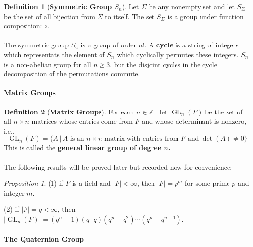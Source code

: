 \documentclass[paper=a4, fontsize=11pt]{scrartcl}
\numberwithin{equation}{section}		%
\numberwithin{figure}{section}			%
\numberwithin{table}{section}				%
\newcommand{\GL}{\ensuremath{\operatorname{GL}}}
\renewcommand{\det}{\ensuremath{\operatorname{det}}}
\theoremstyle{definition}
\newtheorem{definition}{Definition}[section]
\theoremstyle{remark}
\theoremstyle{example}
\newtheorem{prop}{Proposition}[section]
\begin{document}
\begin{definition}[\textbf{Symmetric Group $S_n$}]
    Let $\Sigma$ be any nonempty set and let $S_{\Sigma}$ be the set of all bijection from $\Sigma$ to itself. The set $S_{\Sigma}$ is a group under function composition: $\circ$.
\end{definition}

\paragraph{}

The symmetric group $S_n$ is a group of order $n!$. A \textbf{cycle} is a string of integers which representats the element of $S_n$ which cyclically permutes these integers. $S_n$ is a non-abelian group for all $n \geq 3$, but the disjoint cycles in the cycle decomposition of the permutations commute.

\paragraph{Matrix Groups}

\begin{definition}[\textbf{Matrix Groups}]
    For each $n \in \mathbb{Z}^{+}$ let $\GL_n(F)$ be the set of all $n\times n$ matrices whose entries come from $F$ and whose determinant is nonzero, i.e.,
    \begin{equation}
        {\GL}_n(F) = \{A \,\lvert\,A \text{ is an } n \times n \text{ matrix with entries from } F \text{ and } \det(A) \neq 0\}
    \end{equation}
    This is called the \textbf{general linear group of degree $n$.}
\end{definition}

\paragraph{}

The following results will be proved later but recorded now for convenience:

\begin{prop}
    (1) if $F$ is a field and $\lvert F \rvert < \infty$, then $\lvert F \rvert = p^m$ for some prime $p$ and integer $m$.
    
    (2) if $\lvert F \rvert = q < \infty$, then $\lvert \GL_n(F)\rvert = (q^n - 1)(q^ - q)(q^n-q^2)\cdots(q^n-q^{n-1})$.
\end{prop}

\paragraph{The Quaternion Group}
\end{document}
